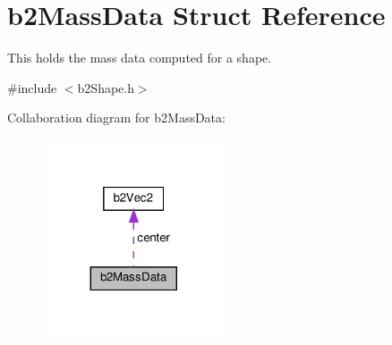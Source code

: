\hypertarget{structb2MassData}{}\section{b2\+Mass\+Data Struct Reference}
\label{structb2MassData}


This holds the mass data computed for a shape.  




{\ttfamily \#include $<$b2\+Shape.\+h$>$}



Collaboration diagram for b2\+Mass\+Data\+:
\nopagebreak
\begin{figure}[H]
\begin{center}
\leavevmode
\includegraphics[width=152pt]{structb2MassData__coll__graph}
\end{center}
\end{figure}
